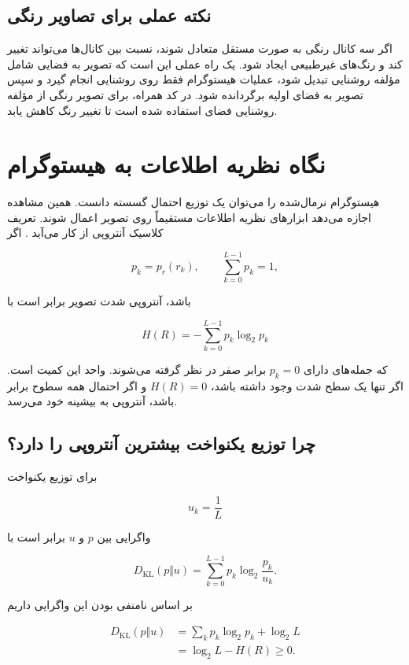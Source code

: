 \documentclass[12pt,a4paper]{article}
\begin{document}
\subsection{نکته عملی برای تصاویر رنگی}

اگر سه کانال رنگی به صورت مستقل متعادل شوند، نسبت بین کانال‌ها می‌تواند تغییر کند و
رنگ‌های غیرطبیعی ایجاد شود. یک راه عملی این است که تصویر به فضایی شامل مؤلفه روشنایی
تبدیل شود، عملیات هیستوگرام فقط روی روشنایی انجام گیرد و سپس تصویر به فضای اولیه
برگردانده شود. در کد همراه، برای تصویر رنگی از مؤلفه روشنایی فضای  استفاده شده
است تا تغییر رنگ کاهش یابد.

\section{نگاه نظریه اطلاعات به هیستوگرام}

هیستوگرام نرمال‌شده را می‌توان یک توزیع احتمال گسسته دانست. همین مشاهده اجازه می‌دهد
ابزارهای نظریه اطلاعات مستقیماً روی تصویر اعمال شوند. تعریف کلاسیک آنتروپی از کار
 می‌آید \cite{shannon1948}. اگر

\[
 p_k=p_r(r_k),
 \qquad
 \sum_{k=0}^{L-1}p_k=1,
\]

باشد، آنتروپی شدت تصویر برابر است با

\[
 \boxed{
 H(R)=-\sum_{k=0}^{L-1}p_k\log_2 p_k
 }
\]

که جمله‌های دارای $p_k=0$ برابر صفر در نظر گرفته می‌شوند. واحد این کمیت  است.
اگر تنها یک سطح شدت وجود داشته باشد، $H(R)=0$ و اگر احتمال همه سطوح برابر باشد،
آنتروپی به بیشینه خود می‌رسد.

\subsection{چرا توزیع یکنواخت بیشترین آنتروپی را دارد؟}

برای توزیع یکنواخت

\[
 u_k=\frac{1}{L}
\]

واگرایی  بین $p$ و $u$ برابر است با

\[
 D_{\mathrm{KL}}(p\Vert u)
 =
 \sum_{k=0}^{L-1}p_k
 \log_2\frac{p_k}{u_k}.
\]

بر اساس نامنفی بودن این واگرایی \cite{kullback1951} داریم

\[
 \begin{aligned}
 D_{\mathrm{KL}}(p\Vert u)
 &=\sum_k p_k\log_2 p_k+\log_2 L\\
 &=\log_2L-H(R)\ge 0.
 \end{aligned}
\]
\end{document}
